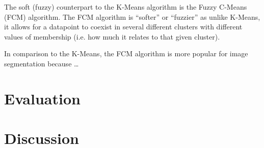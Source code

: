 \documentclass[10pt,twocolumn]{article}
\begin{document}
\indent The soft (fuzzy) counterpart to the K-Means algorithm is the Fuzzy C-Means (FCM) algorithm. The FCM algorithm is “softer” or “fuzzier” as unlike K-Means, it allows for a datapoint to coexist in several different clusters with different values of membership (i.e. how much it relates to that given cluster).



In comparison to the K-Means, the FCM algorithm is more popular for image segmentation because …



\section {Evaluation}

\section {Discussion}




\printbibliography
 
\end{document}
